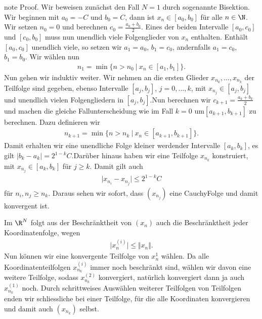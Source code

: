 \documentclass[letterpaper,10pt,english]{jupyterBook}
\begin{document}
\begin{sphinxadmonition}{note}
Proof.  Wir beweisen zunächst den Fall \(N=1\) durch sogenannte Bisektion. Wir beginnen mit \(a_0=-C\) und \(b_0=C\), dann ist \(x_n \in [a_0,b_0]\) für alle \(n \in \N\). Wir setzen \(n_0 =0\) und berechnen \(c_0=\frac{a_0+b_0}2\). Eines der beiden Intervalle \([a_0,c_0]\) und \([c_0,b_0]\) muss nun unendlich viele Folgenglieder von \(x_n\) enthalten. Enthält \([a_0,c_0]\) unendlich viele, so setzen wir \(a_1=a_0\), \(b_1=c_0\), andernfalls \(a_1=c_0\), \(b_1=b_0\). Wir wählen nun
\begin{equation*}
\begin{split} n_1 = \min\{n > n_0~|~x_n \in [a_1,b_1] \}.\end{split}
\end{equation*}
Nun gehen wir induktiv weiter.
Wir nehmen an die ersten Glieder \(x_{n_0},\ldots,x_{n_k}\) der Teilfolge sind gegeben, ebenso Intervalle \([a_j,b_j]\), \(j=0,\ldots,k\),  mit \(x_{n_j} \in [a_j,b_j]\) und unendlich vielen Folgengliedern in \( [a_j,b_j]\).Nun berechnen wir \(c_{k+1}= \frac{a_k + b_k}2\) und machen die gleiche Fallunterscheidung wie im Fall \(k=0\) um\([a_{k+1},b_{k+1}]\) zu berechnen. Dazu definieren wir
\begin{equation*}
\begin{split} n_{k+1} = \min\{n > n_k~|~x_n \in [a_{k+1},b_{k+1}] \}.\end{split}
\end{equation*}
Damit erhalten wir eine unendliche Folge kleiner werdender Intervalle \([a_k,b_k]\), es gilt \(|b_k - a_k|=2^{1-k}C\).Darüber hinaus haben wir eine Teilfolge \(x_{n_k}\) konstruiert, mit \(x_{n_j} \in [a_k,b_k]\) für \(j \geq k\). Damit gilt auch
\begin{equation*}
\begin{split} \vert x_{n_i} - x_{n_j} \vert \leq 2^{1-k} C\end{split}
\end{equation*}
für \(n_i, n_j \geq n_k. \) Daraus sehen wir sofort, dass \((x_{n_j})\) eine Cauchy\sphinxhyphen{}Folge und damit konvergent ist.

Im \(\R^N\) folgt aus der Beschränktheit von \((x_n)\) auch die Beschränktheit jeder Koordinatenfolge, wegen
\begin{equation*}
\begin{split} \vert x_n^{(i)} \vert \leq \Vert x_n \Vert .\end{split}
\end{equation*}
Nun können wir eine konvergente Teilfolge von \(x_n^{1}\) wählen. Da alle Koordinatenteilfolgen \(x_{n_k}^{(i)}\) immer noch beschränkt sind, wählen wir davon eine weitere Teilfolge, sodass \(x_{n_k}^{(2)}\) konvergiert, natürlich konvergiert dann ja auch \(x_{n_k}^{(1)}\) noch. Durch schrittweises Auswählen weiterer Teilfolgen von Teilfolgen enden wir schliessliche bei einer Teilfolge, für die alle Koordinaten konvergieren und damit auch \((x_{n_k})\) selbst.
\end{sphinxadmonition}
\end{document}
